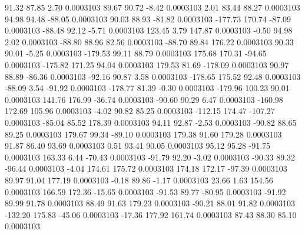        91.32       87.85        2.70     0.0003103
       89.67       90.72       -8.42     0.0003103
        2.01       83.44       88.27     0.0003103
       94.98       94.48      -88.05     0.0003103
       90.03       88.93      -81.82     0.0003103
     -177.73      170.74      -87.09     0.0003103
      -88.48       92.12       -5.71     0.0003103
      123.45        3.79      147.87     0.0003103
       -0.50       94.98        2.02     0.0003103
      -88.80       88.96       82.56     0.0003103
      -88.70       89.84      176.22     0.0003103
       90.33       90.01       -5.25     0.0003103
     -179.53       99.11       88.79     0.0003103
      175.68      170.31      -94.65     0.0003103
     -175.82      171.25       94.04     0.0003103
      179.53       81.69     -178.09     0.0003103
       90.97       88.89      -86.36     0.0003103
      -92.16       90.87        3.58     0.0003103
     -178.65      175.52       92.48     0.0003103
      -88.09        3.54      -91.92     0.0003103
     -178.77       81.39       -0.30     0.0003103
     -179.96      100.23       90.01     0.0003103
      141.76      176.99      -36.74     0.0003103
      -90.60       90.29        6.47     0.0003103
     -160.98      172.69      105.96     0.0003103
       -4.02       90.82       85.25     0.0003103
     -112.15      174.47     -107.27     0.0003103
      -85.04       85.52      178.39     0.0003103
       94.11       92.87       -2.53     0.0003103
      -90.82       88.65       89.25     0.0003103
      179.67       99.34      -89.10     0.0003103
      179.38       91.60      179.28     0.0003103
       91.87       86.40       93.69     0.0003103
        0.51       93.41       90.05     0.0003103
       95.12       95.28      -91.75     0.0003103
      163.33        6.44      -70.43     0.0003103
      -91.79       92.20       -3.02     0.0003103
      -90.33       89.32      -96.44     0.0003103
       -4.04      174.61      175.72     0.0003103
      174.18      172.17      -97.39     0.0003103
       89.97       91.04      177.19     0.0003103
       -0.18       89.86       -1.17     0.0003103
       23.66        1.63      154.56     0.0003103
      166.59      172.36      -15.65     0.0003103
      -91.53       89.77      -80.95     0.0003103
      -91.92       89.99       91.78     0.0003103
       88.49       91.63      179.23     0.0003103
      -90.21       88.01       91.82     0.0003103
     -132.20      175.83      -45.06     0.0003103
      -17.36      177.92      161.74     0.0003103
       87.43       88.30       85.10     0.0003103
